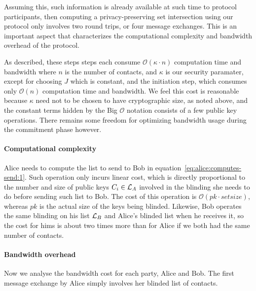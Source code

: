 \documentclass{article}
\begin{document}
Assuming this, such information is already available at such time to protocol
participants, then computing a privacy-preserving set intersection
using our protocol only involves two round trips, or four message
exchanges. This is an important aspect that characterizes the
computational complexity and bandwidth overhead of the protocol.

As described, these steps steps each consume $\mathcal{O}(\kappa \cdot n)$ computation
time and bandwidth where $n$ is the number of contacts, and $\kappa$
is our security paramater, except for choosing $J$ which is constant,
and the initiation step, which consumes only $\mathcal{O}(n)$ computation time
and bandwidth.  We feel this cost is reasonable because $\kappa$ need
not to be chosen to have cryptographic size, as noted above, and the
constant terms hidden by the Big $\mathcal{O}$ notation consists of a few public key
operations. There remains some freedom for optimizing bandwidth usage
during the commitment phase however.

\medskip
\paragraph{Computational complexity}
%
Alice needs to compute the list to send to Bob in
equation~\ref{eq:alice:computes-send:1}. Such operation only incurs
linear cost, which is directly proportional to the number and size of
public keys $C_i\in {\cal L}_A$ involved in the blinding she needs to do
before sending such list to Bob. The cost of this operation is
$\mathcal{O}(pk \cdot setsize)$, whereas $pk$ is the actual size
of the keys being blinded. Likewise, Bob operates the same blinding on his list
${\cal L}_B$ and Alice's blinded list when he receives it, so the cost
for hims is about two times more than for Alice if we both had the
same number of contacts.


\medskip
\paragraph{Bandwidth overhead}
%
Now we analyse the bandwidth cost for each party, Alice and Bob.  The
first message exchange by Alice simply involves her blinded list of
contacts.
\end{document}
